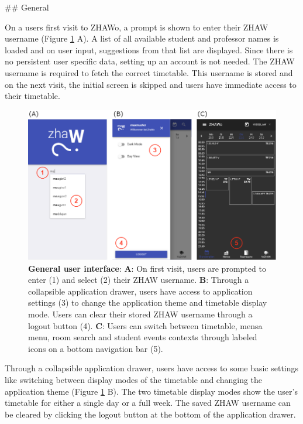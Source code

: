 \begin{markdown}
## General

On a users first visit to ZHAWo, a prompt is shown to enter their ZHAW username (Figure \ref{fig:LoginFigure} A). A list of all available student and professor names is loaded and on user input, suggestions from that list are displayed. Since there is no persistent user specific data, setting up an account is not needed. The ZHAW username is required to fetch the correct timetable. This username is stored and on the next visit, the initial screen is skipped and users have immediate access to their timetable.

\begin{figure}[H]
  \includegraphics[width=16cm, center]{./figures/login_figure.png}
  \captionsetup{width=15.5cm}
  \caption[General user interface]{\textbf{General user interface}: \textbf{A}: On first visit, users are prompted to enter (1) and select (2) their ZHAW username. \textbf{B}: Through a collapsible application drawer, users have access to application settings (3) to change the application theme and timetable display mode. Users can clear their stored ZHAW username through a logout button (4). \textbf{C}: Users can switch between timetable, mensa menu, room search and student events contexts through labeled icons on a bottom navigation bar (5).}
  \label{fig:LoginFigure}
\end{figure}

Through a collapsible application drawer, users have access to some basic settings like switching between display modes of the timetable and changing the application theme (Figure \ref{fig:LoginFigure} B). The two timetable display modes show the user's timetable for either a single day or a full week. The saved ZHAW username can be cleared by clicking the logout button at the bottom of the application drawer.


\end{markdown}
